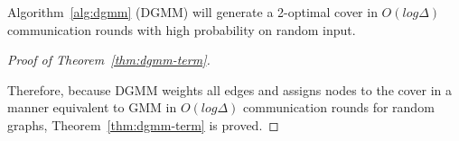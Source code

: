 \begin{thm}
  Algorithm~\ref{alg:dgmm} (DGMM) will generate a 2-optimal cover in $O(log \Delta)$ communication rounds with high probability on random input.
\label{thm:dgmm-term}
\end{thm}

\begin{proof}[Proof of Theorem~\ref{thm:dgmm-term}]
\label{prf:correct}




Therefore, because DGMM weights all edges and assigns nodes to the cover in a manner equivalent to GMM in $O(log \Delta)$ communication rounds for random graphs, Theorem~\ref{thm:dgmm-term} is proved.
\end{proof}
